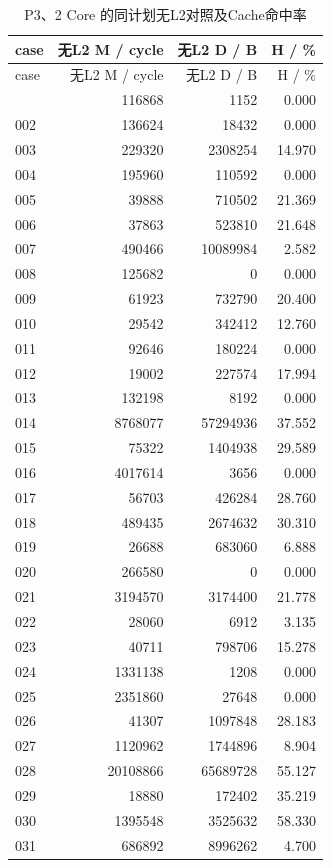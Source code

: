 \documentclass[anonymous,notoc]{gmcm2026}
\begin{document}
\begin{longtable}{lrrr}
\caption{P3、2 Core 的同计划无L2对照及Cache命中率}\\
\toprule
case & 无L2 M / cycle & 无L2 D / B & H / \%\\\midrule
\endfirsthead
\toprule
case & 无L2 M / cycle & 无L2 D / B & H / \%\\\midrule
\endhead
\bottomrule\endfoot
001 & 116868 & 1152 & 0.000 \\
002 & 136624 & 18432 & 0.000 \\
003 & 229320 & 2308254 & 14.970 \\
004 & 195960 & 110592 & 0.000 \\
005 & 39888 & 710502 & 21.369 \\
006 & 37863 & 523810 & 21.648 \\
007 & 490466 & 10089984 & 2.582 \\
008 & 125682 & 0 & 0.000 \\
009 & 61923 & 732790 & 20.400 \\
010 & 29542 & 342412 & 12.760 \\
011 & 92646 & 180224 & 0.000 \\
012 & 19002 & 227574 & 17.994 \\
013 & 132198 & 8192 & 0.000 \\
014 & 8768077 & 57294936 & 37.552 \\
015 & 75322 & 1404938 & 29.589 \\
016 & 4017614 & 3656 & 0.000 \\
017 & 56703 & 426284 & 28.760 \\
018 & 489435 & 2674632 & 30.310 \\
019 & 26688 & 683060 & 6.888 \\
020 & 266580 & 0 & 0.000 \\
021 & 3194570 & 3174400 & 21.778 \\
022 & 28060 & 6912 & 3.135 \\
023 & 40711 & 798706 & 15.278 \\
024 & 1331138 & 1208 & 0.000 \\
025 & 2351860 & 27648 & 0.000 \\
026 & 41307 & 1097848 & 28.183 \\
027 & 1120962 & 1744896 & 8.904 \\
028 & 20108866 & 65689728 & 55.127 \\
029 & 18880 & 172402 & 35.219 \\
030 & 1395548 & 3525632 & 58.330 \\
031 & 686892 & 8996262 & 4.700 \\

\end{longtable}
\end{document}
